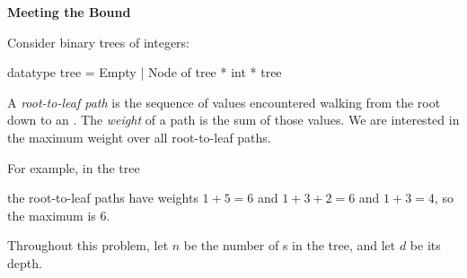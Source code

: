 \newpage
{}

\textbf{Meeting the Bound}

Consider binary trees of integers:

\begin{codeblock}
  datatype tree = Empty | Node of tree * int * tree
\end{codeblock}

A \textit{root-to-leaf path} is the sequence of values encountered walking from
the root down to an . The \textit{weight} of a path is the sum of
those values. We are interested in the maximum weight over all root-to-leaf
paths.

For example, in the tree

\begin{center}
\end{center}

the root-to-leaf paths have weights $1 + 5 = 6$ and $1 + 3 + 2 = 6$ and
$1 + 3 = 4$, so the maximum is $6$.

Throughout this problem, let $n$ be the number of s in the tree, and
let $d$ be its depth.

